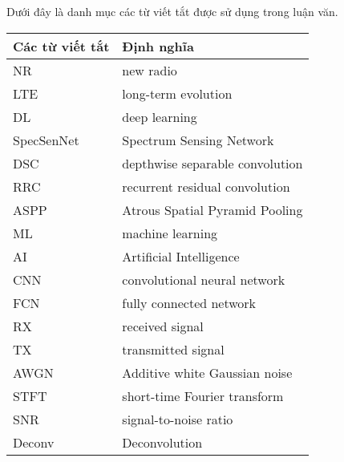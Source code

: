 \documentclass[a4paper, oneside]{book}
\begin{document}
\tableofcontents
\listoftables
\listoffigures


\begin{abbreviation}
Dưới đây là danh mục các từ viết tắt được sử dụng trong luận văn.
\begin{table}[!h]
\renewcommand{\arraystretch}{1.3}
\begin{tabular}{p{3cm} p{11cm}}
\hline
\textbf{Các từ viết tắt} &  \textbf{Định nghĩa} \\
\hline
NR & new radio \\
LTE & long-term evolution \\
DL & deep learning \\
SpecSenNet & Spectrum Sensing Network \\
DSC & depthwise separable convolution \\
RRC & recurrent residual convolution \\
ASPP & Atrous Spatial Pyramid Pooling  \\
ML & machine learning \\
AI & Artificial Intelligence \\
CNN & convolutional neural network \\
FCN & fully connected network \\
RX & received signal \\
TX & transmitted signal \\
AWGN & Additive white Gaussian noise \\
STFT & short-time Fourier transform \\
SNR & signal-to-noise ratio \\
Deconv & Deconvolution \\
\hline
\end{tabular}
\end{table}
\end{abbreviation}	



\mainmatter


\pagestyle{plain} %








\end{document}
